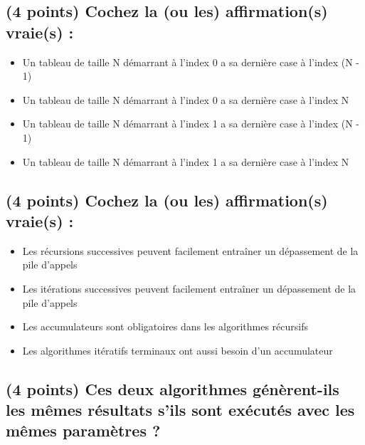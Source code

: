 \documentclass[11pt,a4paper]{article}
\begin{document}
\bigskip


\subsection{(4 points) Cochez la (ou les) affirmation(s) vraie(s) : }

\begin{itemize}
  \item[\checkmark] Un tableau de taille N démarrant à l'index 0 a sa dernière case à l'index (N - 1) \\ %
  \item[\CaseCoche] Un tableau de taille N démarrant à l'index 0 a sa dernière case à l'index N \\
  \item[\CaseCoche] Un tableau de taille N démarrant à l'index 1 a sa dernière case à l'index (N - 1) \\
  \item[\checkmark] Un tableau de taille N démarrant à l'index 1 a sa dernière case à l'index N \\ %
\end{itemize}


\bigskip


\subsection{(4 points) Cochez la (ou les) affirmation(s) vraie(s) : }

\begin{itemize}
  \item[\checkmark] Les récursions successives peuvent facilement entraîner un dépassement de la pile d'appels \\ %
  \item[\CaseCoche] Les itérations successives peuvent facilement entraîner un dépassement de la pile d'appels \\
  \item[\CaseCoche] Les accumulateurs sont obligatoires dans les algorithmes récursifs \\
  \item[\CaseCoche] Les algorithmes itératifs terminaux ont aussi besoin d'un accumulateur \\
\end{itemize}


\newpage

\subsection{(4 points) Ces deux algorithmes génèrent-ils les mêmes résultats s'ils sont exécutés avec les mêmes paramètres ? }
\end{document}
